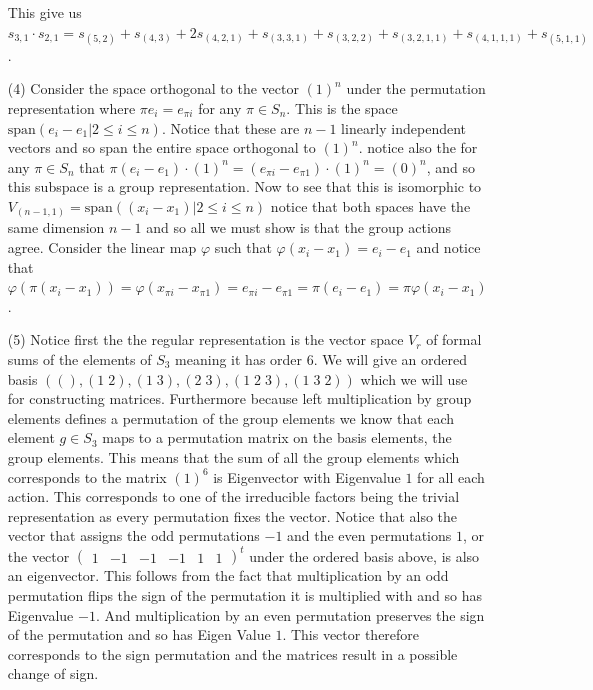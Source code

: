 \documentclass[12pt]{amsart}
\theoremstyle{definition}
\let\phi\varphi
\begin{document}
\begin{itemize}
This give us $s_{3,1}\cdot s_{2,1}=s_{(5,2)}+s_{(4,3)}+2 s_{(4,2,1)}+s_{(3,3,1)}+s_{(3,2,2)}+s_{(3,2,1,1)}+s_{(4,1,1,1)}+s_{(5,1,1)}$.\\

\item[(4)] %
Consider the space orthogonal to the vector $(1)^n$ under the permutation representation where $\pi e_i = e_{\pi i}$ for any $\pi\in S_n$. This is the space $\text{span}(e_i-e_1 | 2\leq i\leq n)$. Notice that these are $n-1$ linearly independent vectors and so span the entire space orthogonal to $(1)^n$. notice also the for any $\pi\in S_n$ that $\pi(e_i-e_1)\cdot (1)^n=(e_{\pi i}-e_{\pi 1})\cdot (1)^n=(0)^n$, and so this subspace is a group representation. Now to see that this is isomorphic to $V_{(n-1,1)}=\text{span}((x_i-x_1)|2\leq i\leq n)$ notice that both spaces have the same dimension $n-1$ and so all we must show is that the group actions agree. Consider the linear map $\phi$ such that $\phi(x_i-x_1)=e_i-e_1$ and notice that $\phi(\pi(x_i-x_1))=\phi(x_{\pi i}-x_{\pi 1})=e_{\pi i}-e_{\pi 1}=\pi(e_i-e_1)=\pi\phi(x_i-x_1)$.\\

\item[(5)] %
Notice first the the regular representation is the vector space $V_r$ of formal sums of the elements of $S_3$ meaning it has order $6$. We will give an ordered basis $((),(1\;2),(1\;3),(2\;3),(1\;2\;3),(1\;3\;2))$ which we will use for constructing matrices. Furthermore because left multiplication by group elements defines a permutation of the group elements we know that each element $g\in S_3$ maps to a permutation matrix on the basis elements, the group elements. This means that the sum of all the group elements which corresponds to the matrix $(1)^6$ is Eigenvector with Eigenvalue $1$ for all each action. This corresponds to one of the irreducible factors being the trivial representation as every permutation fixes the vector. Notice that also the vector that assigns the odd permutations $-1$ and the even permutations $1$, or the vector $\begin{pmatrix}1&-1&-1&-1&1&1\end{pmatrix}^t$ under the ordered basis above, is also an eigenvector. This follows from the fact that multiplication by an odd permutation flips the sign of the permutation it is multiplied with and so has Eigenvalue $-1$. And multiplication by an even permutation preserves the sign of the permutation and so has Eigen Value $1$. This vector therefore corresponds to the sign permutation and the matrices result in a possible change of sign.\\


\end{itemize}
\end{document}
